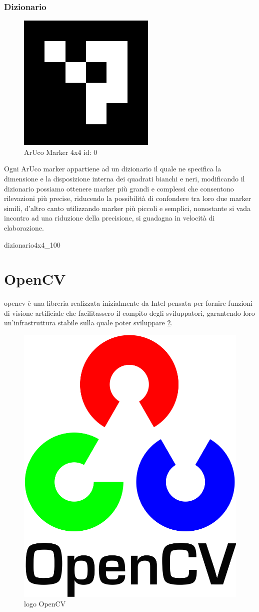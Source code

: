 \documentclass[12pt,a4paper,openright,twoside]{book}
\begin{document}
\subsubsection{Dizionario} \label{subsubsec:dizionario}
\label{Dizionario}
\begin{figure}
	\centering
	\includegraphics[width=0.5\linewidth]{./figures/4x4_1000-0.png}
	\caption{ArUco Marker 4x4 id: 0}
	\label{fig:aruco_marker_0}
\end{figure}
Ogni ArUco marker appartiene ad un dizionario il quale ne specifica la dimensione e la disposizione interna dei quadrati bianchi e neri, modificando il dizionario possiamo ottenere marker più grandi e complessi che consentono rilevazioni più precise, riducendo la possibilità di confondere tra loro due marker simili, d'altro canto utilizzando marker più piccoli e semplici, nonostante si vada incontro ad una riduzione della precisione, si guadagna in velocità di elaborazione. \cite{reverseEngineeringArucoMarkers}
 
\begin{center}
	\gls{dizionario4x4_100}
\end{center}

\section{OpenCV} \label{sec:opencv}
\acrfull{opencv} è una libreria realizzata inizialmente da Intel pensata per fornire funzioni di visione artificiale che facilitassero il compito degli sviluppatori, garantendo loro un'infrastruttura stabile sulla quale poter sviluppare \ref{fig:opencvLogo}.
\begin{figure}
	\centering
	\includegraphics[width=0.3\linewidth]{figures/opencvLogo.png}
	\caption{logo OpenCV}
	\label{fig:opencvLogo}
\end{figure}
\end{document}
